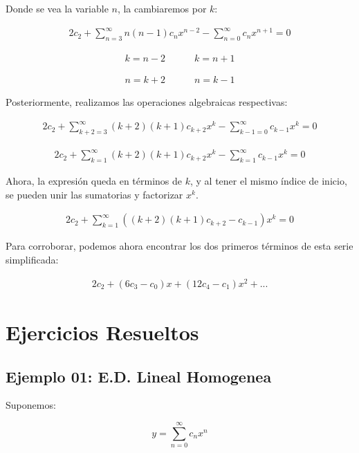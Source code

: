 Donde se vea la variable \( n \), la cambiaremos por \( k \):

\begin{gather*}
2c_{2} +\sum _{n=3}^{\infty } n( n-1) c_{n} x^{n-2} -\sum _{n=0}^{\infty } c_{n} x^{n+1} = 0
\end{gather*}

\begin{gather*}
k = n-2 \quad \quad \quad k = n+1
\end{gather*}

\begin{gather*}
n = k+2 \quad \quad \quad n = k-1
\end{gather*}

Posteriormente, realizamos las operaciones algebraicas respectivas:

\begin{gather*}
2c_{2} +\sum _{k+2=3}^{\infty }( k+2)( k+1) c_{k+2} x^{k} -\sum _{k-1=0}^{\infty } c_{k-1} x^{k} = 0
\end{gather*}

\begin{gather*}
2c_{2} +\sum _{k=1}^{\infty }( k+2)( k+1) c_{k+2} x^{k} -\sum _{k=1}^{\infty } c_{k-1} x^{k} = 0
\end{gather*}

Ahora, la expresión queda en términos de \( k \), y al tener el mismo índice de inicio,  
se pueden unir las sumatorias y factorizar \( x^{k} \).

\begin{gather*}
2c_{2} +\sum _{k=1}^{\infty }(( k+2)( k+1) c_{k+2} - c_{k-1}) x^{k} = 0
\end{gather*}

Para corroborar, podemos ahora encontrar los dos primeros términos de esta serie simplificada:

\begin{gather*}
2c_{2} +( 6c_{3} -c_{0}) x + ( 12c_{4} -c_{1}) x^{2} +...
\end{gather*}

\section{Ejercicios Resueltos}

\subsection*{Ejemplo 01: E.D. Lineal Homogenea}
Suponemos:

\begin{equation}
y = \sum_{n=0}^{\infty} c_n x^n
\end{equation}


